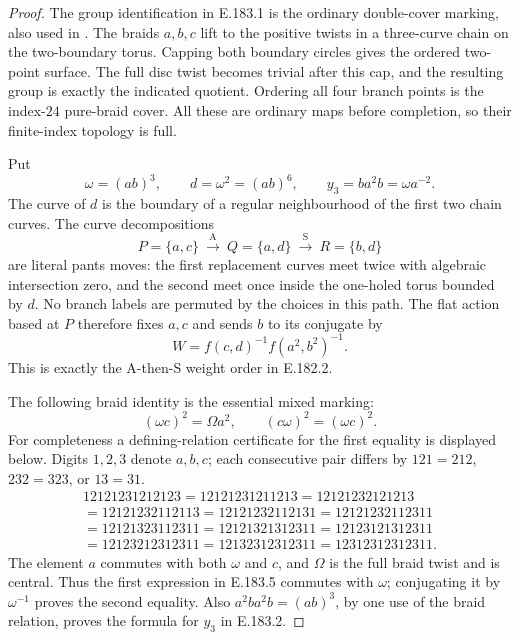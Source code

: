 \begin{proof}
The group identification in E.183.1 is the ordinary
double-cover marking, also used in
\citet[\S1, p.659]{LitSchneps2006Automorphisms}.
The braids \(a,b,c\) lift to the positive twists in a
three-curve chain on the two-boundary torus.  Capping both
boundary circles gives the ordered two-point surface.
The full disc twist becomes trivial after this cap, and
the resulting group is exactly the indicated quotient.
Ordering all four branch points is the index-\(24\)
pure-braid cover.  All these are ordinary maps before
completion, so their finite-index topology is full.

Put
\[
        \omega=(ab)^3,\qquad d=\omega^2=(ab)^6,
        \qquad y_3=ba^2b=\omega a^{-2}.
\tag{E.183.2}
\]
The curve of \(d\) is the boundary of a regular
neighbourhood of the first two chain curves.
The curve decompositions
\[
        P=\{a,c\}\ \xrightarrow{\mathrm A}\
        Q=\{a,d\}\ \xrightarrow{\mathrm S}\
        R=\{b,d\}
\tag{E.183.3}
\]
are literal pants moves: the first replacement curves meet
twice with algebraic intersection zero, and the second
meet once inside the one-holed torus bounded by \(d\).
No branch labels are permuted by the choices in this path.
The flat action based at \(P\) therefore fixes \(a,c\)
and sends \(b\) to its conjugate by
\[
                   W=f(c,d)^{-1}f(a^2,b^2)^{-1}.
\tag{E.183.4}
\]
This is exactly the A-then-S weight order in E.182.2.

The following braid identity is the essential mixed marking:
\[
                 (\omega c)^2=\Omega a^2,
                 \qquad (c\omega)^2=(\omega c)^2.
\tag{E.183.5}
\]
For completeness a defining-relation certificate for the
first equality is displayed below.  Digits \(1,2,3\)
denote \(a,b,c\); each consecutive pair differs by
\(121=212\), \(232=323\), or \(13=31\).
\[
 \begin{gathered}
 12121231212123=12121231211213=12121232121213\\
 =12121232112113=12121232112131=12121232112311\\
 =12121323112311=12121321312311=12123121312311\\
 =12123212312311=12132312312311=12312312312311.
 \end{gathered}
\tag{E.183.6}
\]
The element \(a\) commutes with both \(\omega\) and \(c\),
and \(\Omega\) is the full braid twist and is central.
Thus the first expression in E.183.5 commutes with
\(\omega\); conjugating it by \(\omega^{-1}\) proves
the second equality.  Also
\(a^2ba^2b=(ab)^3\), by one use of the braid relation,
proves the formula for \(y_3\) in E.183.2.


\end{proof}
